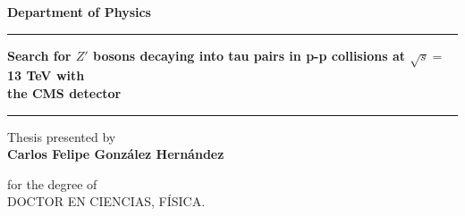 \oddsidemargin 0.4cm \evensidemargin 0.4cm \topmargin 1.0cm
\textwidth 15.7cm \textheight 21.0cm \headsep 1.2cm \footskip 1.0cm

\begin{figure}[ht]
\begin{center}
\end{center}
\end{figure}

\vspace{1.0cm}

\begin{center}
\textbf{Department of Physics}\\
\end{center}

\vspace{1.0cm}

\begin{center} 
\rule{\linewidth}{0.5 mm}
\LARGE{\textbf{Search for $Z'$ bosons decaying into tau pairs in 
p-p collisions at $\sqrt{s}=$13 TeV with\\ the CMS detector}}\\
\rule{\linewidth}{0.5 mm} 
\end{center}

\vspace{1.5em}
\begin{center}
\small Thesis presented by\\
\Large \textbf{Carlos Felipe Gonz\'{a}lez Hern\'{a}ndez}
\end{center}

\vspace{1.0em}
\begin{center}
for the degree of\\
DOCTOR EN CIENCIAS, FÍSICA.
\vspace{1.5em}
\end{center}

